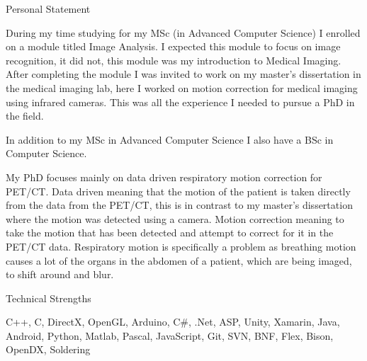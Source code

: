 \documentclass{cv}
\begin{document}

\begin{rSection}{Personal Statement}

\item During my time studying for my MSc (in Advanced Computer Science) I enrolled on a module titled Image Analysis. I expected this module to focus on image recognition, it did not, this module was my introduction to Medical Imaging. After completing the module I was invited to work on my master’s dissertation in the medical imaging lab, here I worked on motion correction for medical imaging using infrared cameras. This was all the experience I needed to pursue a PhD in the field.

\item In addition to my MSc in Advanced Computer Science I also have a BSc in Computer Science.

\item My PhD focuses mainly on data driven respiratory motion correction for PET/CT. Data driven meaning that the motion of the patient is taken directly from the data from the PET/CT, this is in contrast to my master’s dissertation where the motion was detected using a camera. Motion correction meaning to take the motion that has been detected and attempt to correct for it in the PET/CT data. Respiratory motion is specifically a problem as breathing motion causes a lot of the organs in the abdomen of a patient, which are being imaged, to shift around and blur.

\end{rSection}


\begin{rSection}{Technical Strengths}

\item C++, C, DirectX, OpenGL, Arduino, C\#, .Net, ASP, Unity, Xamarin, Java, Android, Python, Matlab, Pascal, JavaScript, Git, SVN, BNF,  Flex, Bison, OpenDX, Soldering

\end{rSection}

\end{document}
